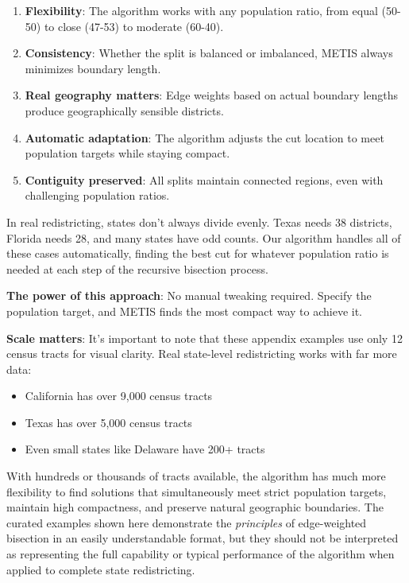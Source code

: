 \documentclass[11pt]{article}
\begin{document}
\begin{enumerate}
\item \textbf{Flexibility}: The algorithm works with any population ratio, from equal (50-50) to close (47-53) to moderate (60-40).

\item \textbf{Consistency}: Whether the split is balanced or imbalanced, METIS always minimizes boundary length.

\item \textbf{Real geography matters}: Edge weights based on actual boundary lengths produce geographically sensible districts.

\item \textbf{Automatic adaptation}: The algorithm adjusts the cut location to meet population targets while staying compact.

\item \textbf{Contiguity preserved}: All splits maintain connected regions, even with challenging population ratios.
\end{enumerate}

In real redistricting, states don't always divide evenly. Texas needs 38 districts, Florida needs 28, and many states have odd counts. Our algorithm handles all of these cases automatically, finding the best cut for whatever population ratio is needed at each step of the recursive bisection process.

\textbf{The power of this approach}: No manual tweaking required. Specify the population target, and METIS finds the most compact way to achieve it.

\textbf{Scale matters}: It's important to note that these appendix examples use only 12 census tracts for visual clarity. Real state-level redistricting works with far more data:
\begin{itemize}
\item California has over 9,000 census tracts
\item Texas has over 5,000 census tracts
\item Even small states like Delaware have 200+ tracts
\end{itemize}

With hundreds or thousands of tracts available, the algorithm has much more flexibility to find solutions that simultaneously meet strict population targets, maintain high compactness, and preserve natural geographic boundaries. The curated examples shown here demonstrate the \textit{principles} of edge-weighted bisection in an easily understandable format, but they should not be interpreted as representing the full capability or typical performance of the algorithm when applied to complete state redistricting.
\end{document}
